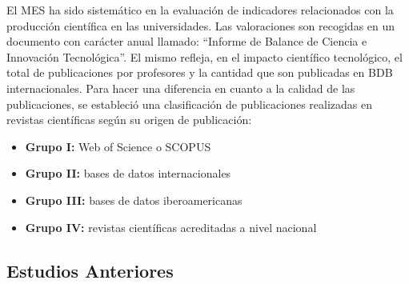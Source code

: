 El \ac{MES} ha sido sistemático en la evaluación de indicadores relacionados con la producción científica en las universidades.
Las valoraciones son recogidas en un documento con carácter anual llamado: ``Informe de Balance de Ciencia e Innovación Tecnológica''. 
El mismo refleja, en el impacto científico tecnológico, el total de publicaciones por profesores y la cantidad que son publicadas en \ac{BDB} internacionales. 
Para hacer una diferencia en cuanto a la calidad de las publicaciones, se estableció una clasificación de publicaciones realizadas en revistas científicas según su origen de publicación:
\begin{itemize}
    \item \textbf{Grupo I:} Web of Science o SCOPUS
    \item \textbf{Grupo II:} bases de datos internacionales
    \item \textbf{Grupo III:} bases de datos iberoamericanas
    \item \textbf{Grupo IV:} revistas científicas acreditadas a nivel nacional
\end{itemize}

\subsection{Estudios Anteriores}\label{sec:estudios_estadodelarte}
\lipsum[1-2]